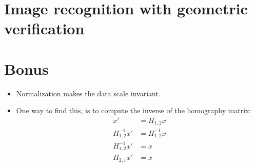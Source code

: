 \documentclass[a4paper,10pt,twoside,draft]{article}
\begin{document}
\section{Image recognition with geometric verification}

\section{Bonus}
\begin{itemize}
    \item Normalization makes the data scale invariant.
    \item One way to find this, is to compute the inverse of the homography matrix:
      \begin{eqnarray*}
        x' &= H_{1,2} x \\
        H_{1,2}^{-1} x' &= H_{1,2}^{-1} x \\
        H_{1,2}^{-1} x' &= x \\
        H_{2,1} x' &= x
      \end{eqnarray*}
\end{itemize}
\end{document}
